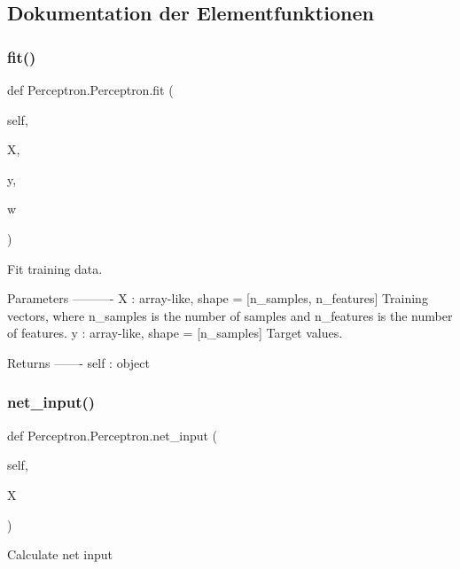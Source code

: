 \subsection{Dokumentation der Elementfunktionen}
\mbox{\label{class_perceptron_1_1_perceptron_a2479bd0c6de945508cf00933916bb2a6}} 
\subsubsection{\texorpdfstring{fit()}{fit()}}
{\footnotesize\ttfamily def Perceptron.\+Perceptron.\+fit (\begin{DoxyParamCaption}\item[{}]{self,  }\item[{}]{X,  }\item[{}]{y,  }\item[{}]{w }\end{DoxyParamCaption})}

\begin{DoxyVerb}Fit training data.

Parameters
----------
X : {array-like}, shape = [n_samples, n_features]
  Training vectors, where n_samples is the number of samples and
  n_features is the number of features.
y : array-like, shape = [n_samples]
  Target values.

Returns
-------
self : object\end{DoxyVerb}
 \mbox{\label{class_perceptron_1_1_perceptron_a21cab7a11445f766e6258d71529da03f}} 
\subsubsection{\texorpdfstring{net\+\_\+input()}{net\_input()}}
{\footnotesize\ttfamily def Perceptron.\+Perceptron.\+net\+\_\+input (\begin{DoxyParamCaption}\item[{}]{self,  }\item[{}]{X }\end{DoxyParamCaption})}

\begin{DoxyVerb}Calculate net input\end{DoxyVerb}
 \mbox{\label{class_perceptron_1_1_perceptron_abe5ade4bde9e08101baaec87b53e7b6e}} 
